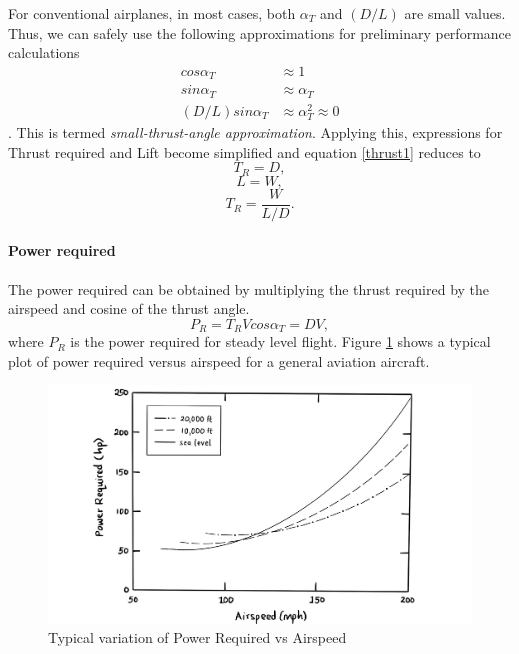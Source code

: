 \documentclass[letterpaper,12pt]{article}
\begin{document}
For conventional airplanes, in most cases, both $\alpha_T$ and $(D/L)$ are small values. Thus, we can safely use the following approximations for preliminary performance calculations
\begin{align*}
cos\alpha_T&\approx 1\\
sin\alpha_T&\approx \alpha_T\\
(D/L)sin\alpha_T&\approx \alpha_T^2\approx 0
\end{align*}.
This is termed \textit{small-thrust-angle approximation}. Applying this, expressions for Thrust required and Lift become simplified and equation \ref{thrust1} reduces to
\begin{equation}
T_R=D,
\end{equation}
\begin{equation}
L=W,
\end{equation}
\begin{equation}
T_R=\frac{W}{L/D}.
\label{thrust2}
\end{equation}

\paragraph{Power required}
The power required can be obtained by multiplying the thrust required by the airspeed and cosine of the thrust angle.
\begin{equation}
\boxed{
P_R=T_RVcos\alpha_T=DV,
}
\label{power1}
\end{equation}
where $P_R$ is the power required for steady level flight. Figure \ref{PR} shows a typical plot of power required versus airspeed for a general aviation aircraft.
\begin{figure}[H]
\includegraphics[scale=0.3]{plot_PR}
\centering
\caption{Typical variation of Power Required vs Airspeed}
\label{PR}
\end{figure}
\end{document}
